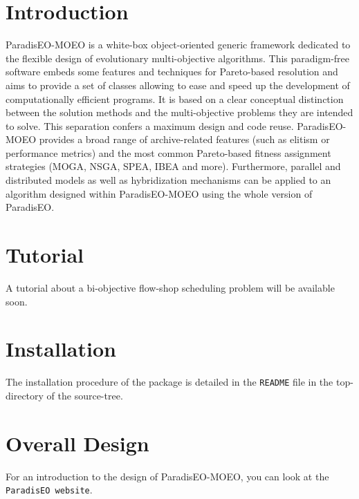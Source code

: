 \section{Introduction}\label{main_intro}
Paradis\-EO-MOEO is a white-box object-oriented generic framework dedicated to the flexible design of evolutionary multi-objective algorithms. This paradigm-free software embeds some features and techniques for Pareto-based resolution and aims to provide a set of classes allowing to ease and speed up the development of computationally efficient programs. It is based on a clear conceptual distinction between the solution methods and the multi-objective problems they are intended to solve. This separation confers a maximum design and code reuse. Paradis\-EO-MOEO provides a broad range of archive-related features (such as elitism or performance metrics) and the most common Pareto-based fitness assignment strategies (MOGA, NSGA, SPEA, IBEA and more). Furthermore, parallel and distributed models as well as hybridization mechanisms can be applied to an algorithm designed within Paradis\-EO-MOEO using the whole version of Paradis\-EO.\section{Tutorial}\label{main_tutorial}
A tutorial about a bi-objective flow-shop scheduling problem will be available soon.\section{Installation}\label{main_install}
The installation procedure of the package is detailed in the {\tt README} file in the top-directory of the source-tree.\section{Overall Design}\label{main_design}
For an introduction to the design of Paradis\-EO-MOEO, you can look at the {\tt Paradis\-EO website}. 